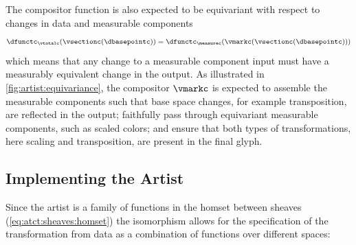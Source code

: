 \documentclass[journal]{IEEEtran}
\theoremstyle{definition}
\theoremstyle{remark}
\begin{document}
The compositor function is also expected to be equivariant with respect to changes in data and measurable components
\begin{equation}
  \label{eq:construnction:q:verify:base}
  \dfunctc_{\vtotalc}(\vsectionc(\dbasepointc)) = \dfunctc_{\measurec}(\vmarkc(\vsectionc(\dbasepointc)))
\end{equation}
which means that any change to a measurable component input must have a measurably equivalent change in the output. As illustrated in \autoref{fig:artist:equivariance}, the compositor $\vmarkc$ is expected to assemble the measurable components such that base space changes, for example transposition, are reflected in the output; faithfully pass through equivariant measurable components, such as scaled colors; and ensure that both types of transformations, here scaling and transposition, are present in the final glyph.

\subsection{Implementing the Artist}
Since the artist is a family of functions in the homset between sheaves (\autoref{eq:atct:sheaves:homset}) the isomorphism allows for the specification of the transformation from data as a combination of functions over different spaces:
\end{document}
